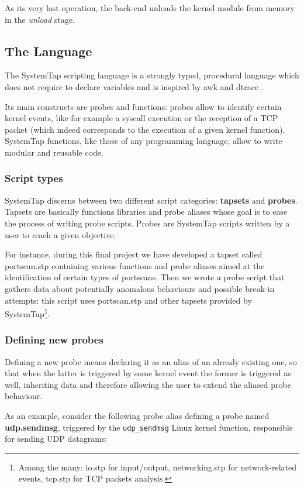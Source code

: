 \documentclass[11pt]{article}
\begin{document}
As its very last operation, the back-end unloads the kernel module from memory
in the \emph{unload} stage.

\subsection{The Language}
\label{systemtap:language}
The SystemTap scripting language is a strongly typed, procedural language which
does not require to declare variables and is inspired by awk and dtrace
\cite{langref}.

Its main constructs are probes and functions: probes allow to identify certain
kernel events, like for example a syscall execution or the reception of a TCP
packet (which indeed corresponds to the execution of a given kernel function).
SystemTap functions, like those of any programming language, allow to write
modular and reusable code.

\subsubsection{Script types}
SystemTap discerns between two different script categories: \textbf{tapsets}
and \textbf{probes}. Tapsets are basically functions libraries and probe
aliases whose goal is to ease the process of writing probe scripts. Probes are
SystemTap scripts written by a user to reach a given objective.

For instance, during this final project we have developed a tapset called
portscan.stp containing various functions and probe aliases aimed at the
identification of certain types of portscans. Then we wrote a probe script that
gathers data about potentially anomalous behaviours and possible break-in
attempts: this script uses portscan.stp and other tapsets provided by
SystemTap\footnote{Among the many: io.stp for input/output, networking.stp for
network-related events, tcp.stp for TCP packets analysis.}.

\subsubsection{Defining new probes}
Defining a new probe means declaring it as an alias of an already existing one,
so that when the latter is triggered by some kernel event the former is
triggered as well, inheriting data and therefore allowing the user to extend
the aliased probe behaviour.

As an example, consider the following probe alias defining a probe named
\textbf{udp.sendmsg}, triggered by the \verb|udp_sendmsg| Linux kernel function,
responsible for sending UDP datagrams:
\end{document}
